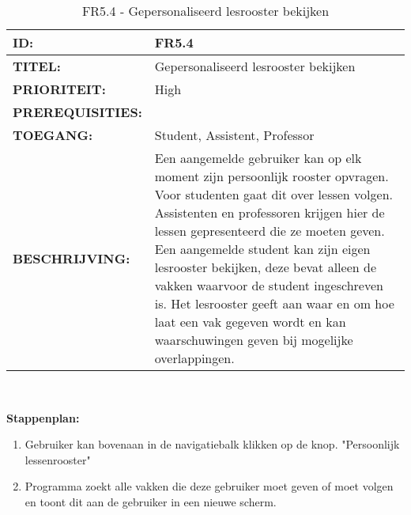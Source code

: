 \noindent\begin{table}[H]
            \begin{tabular}{l | p{10cm}}
                \textbf{ID:} & FR5.4 \\ \hline
                \textbf{TITEL:} & Gepersonaliseerd lesrooster bekijken\\ \hline
                \textbf{PRIORITEIT:} &  High \\ \hline
                \textbf{PREREQUISITIES:} & \\ \hline
                \textbf{TOEGANG:} &  Student, Assistent, Professor \\ \hline
                \textbf{BESCHRIJVING:} & Een aangemelde gebruiker kan op elk moment zijn persoonlijk rooster opvragen. Voor studenten gaat dit over lessen volgen. Assistenten en professoren krijgen hier de lessen gepresenteerd die ze moeten geven. Een aangemelde student kan zijn eigen lesrooster bekijken, deze bevat alleen de vakken waarvoor de student ingeschreven is. 
                                        Het lesrooster geeft aan waar en om hoe laat een vak gegeven wordt en kan waarschuwingen geven bij mogelijke overlappingen.\\ 
            \end{tabular}\\
            \caption{FR5.4  - Gepersonaliseerd lesrooster bekijken}
            \label{tab:FR5.4 - Gepersonaliseerd lesrooster bekijken}
        \end{table}

\textbf{Stappenplan:}
	\begin{enumerate}
	\item Gebruiker kan bovenaan in de navigatiebalk klikken op de knop. "Persoonlijk lessenrooster"
	\item Programma zoekt alle vakken die deze gebruiker moet geven of moet volgen en toont dit aan de gebruiker in een nieuwe scherm.
	\end{enumerate}


